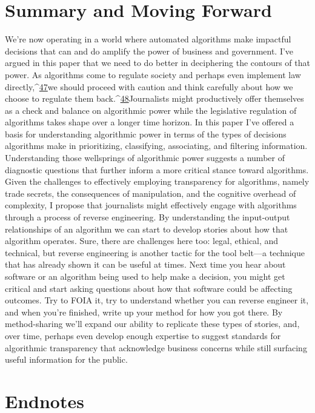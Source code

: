 \chapter{Summary and Moving Forward }
We're now operating in a world where automated algorithms make impactful decisions that can and do amplify the power of business and government. I've argued in this paper that we need to do better in deciphering the contours of that power. As algorithms come to regulate society and perhaps even implement law directly,^{\href{#endnotes}{47}}we should proceed with caution and think carefully about how we choose to regulate them back.^{\href{#endnotes}{48}}Journalists might 
productively offer themselves as a check and balance on algorithmic power while the legislative regulation of algorithms takes shape over a longer time horizon. 
In this paper I've offered a basis for understanding algorithmic power in terms of the types of decisions algorithms make in prioritizing, classifying, associating, and filtering information. Understanding those wellsprings of algorithmic power suggests a number of diagnostic questions that further inform a more critical stance toward algorithms. Given the challenges to effectively employing transparency for algorithms, namely trade secrets, the consequences of manipulation, and the cognitive overhead of complexity, I propose that journalists might effectively engage with algorithms through a process of reverse engineering. By understanding the input-output relationships of an algorithm we can start to develop stories about how that algorithm operates. 
Sure, there are challenges here too: legal, ethical, and technical, but reverse engineering is another tactic for the tool belt—a technique that has already shown it can be useful at times. Next time you hear about software or an algorithm being used to help make a decision, you might get critical and start asking questions about how that software could be affecting outcomes. Try to FOIA it, try to understand whether you can reverse engineer it, and when you're finished, write up your method for how you got there. By method-sharing we'll expand our ability to replicate these types of stories, and, over time, perhaps even develop enough expertise to suggest standards for algorithmic transparency that acknowledge business concerns while still surfacing useful information for the public.


\chapter{Endnotes}

